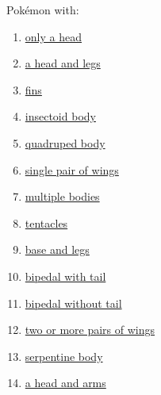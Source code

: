 \documentclass[12pt]{article}
\theoremstyle{plain}
\theoremstyle{definition}
\theoremstyle{remark}
\begin{document}
Pokémon with: 

\begin{multicols}{3}
	\begin{enumerate}[itemsep=2pt,parsep=2pt]
		\item \href{https://bulbapedia.bulbagarden.net/wiki/List_of_Pok%C3%A9mon_by_shape#Pok.C3.A9mon_consisting_of_only_a_head}{only a head}
		\item \href{https://bulbapedia.bulbagarden.net/wiki/List_of_Pok%C3%A9mon_by_shape#Pok.C3.A9mon_consisting_of_a_head_and_legs}{a head and legs}
		\item \href{https://bulbapedia.bulbagarden.net/wiki/List_of_Pok%C3%A9mon_by_shape#Pok.C3.A9mon_with_fins}{fins}
		\item \href{https://bulbapedia.bulbagarden.net/wiki/List_of_Pok%C3%A9mon_by_shape#Pok.C3.A9mon_with_an_insectoid_body}{insectoid body}
		\item \href{https://bulbapedia.bulbagarden.net/wiki/List_of_Pok%C3%A9mon_by_shape#Pok.C3.A9mon_with_an_insectoid_body}{quadruped body}
		\item \href{https://bulbapedia.bulbagarden.net/wiki/List_of_Pok%C3%A9mon_by_shape#Pok.C3.A9mon_with_a_single_pair_of_wings}{single pair of wings}
		\item \href{https://bulbapedia.bulbagarden.net/wiki/List_of_Pok%C3%A9mon_by_shape#Pok.C3.A9mon_consisting_of_multiple_bodies}{multiple bodies}
		\item \href{https://bulbapedia.bulbagarden.net/wiki/List_of_Pok%C3%A9mon_by_shape#Pok.C3.A9mon_with_tentacles_or_a_multiped_body}{tentacles}
		\item \href{https://bulbapedia.bulbagarden.net/wiki/List_of_Pok%C3%A9mon_by_shape#Pok.C3.A9mon_consisting_of_a_head_and_a_base}{base and legs}
		\item \href{https://bulbapedia.bulbagarden.net/wiki/List_of_Pok%C3%A9mon_by_shape#Pok.C3.A9mon_with_a_bipedal.2C_tailed_form}{bipedal with tail}
		\item \href{https://bulbapedia.bulbagarden.net/wiki/List_of_Pok%C3%A9mon_by_shape#Pok.C3.A9mon_with_a_bipedal.2C_tailless_form}{ bipedal without tail}
		\item \href{https://bulbapedia.bulbagarden.net/wiki/List_of_Pok%C3%A9mon_by_shape#Pok.C3.A9mon_with_two_or_more_pairs_of_wings}{two or more pairs of wings}
		\item \href{https://bulbapedia.bulbagarden.net/wiki/List_of_Pok%C3%A9mon_by_shape#Pok.C3.A9mon_with_serpentine_bodies}{serpentine body}
		\item \href{https://bulbapedia.bulbagarden.net/wiki/List_of_Pok%C3%A9mon_by_shape#Pok.C3.A9mon_consisting_of_a_head_and_arms}{a head and arms}
	\end{enumerate}
\end{multicols}
\end{document}
